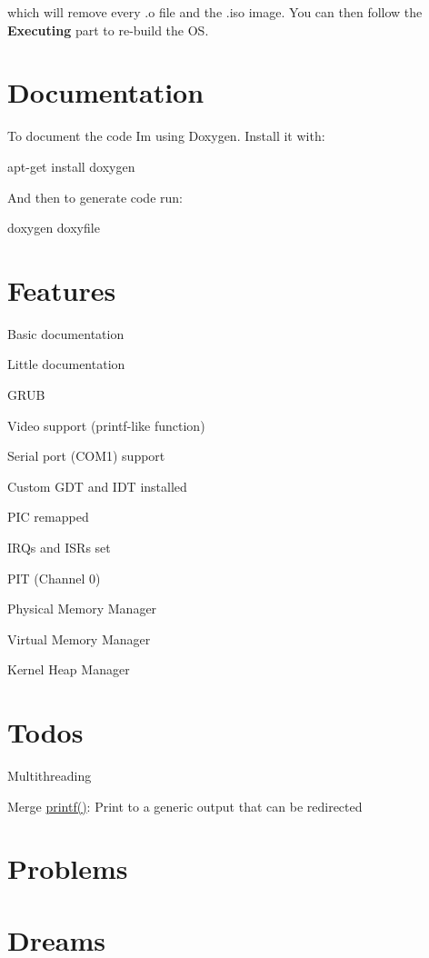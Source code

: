 which will remove every .o file and the .iso image. You can then follow the {\bfseries Executing} part to re-\/build the OS.\hypertarget{index_Documentation}{}\section{Documentation}\label{index_Documentation}
To document the code I\textquotesingle{}m using Doxygen. Install it with\+: 
\begin{DoxyCode}
apt-\textcolor{keyword}{get} install doxygen 
\end{DoxyCode}
 And then to generate code run\+: 
\begin{DoxyCode}
doxygen doxyfile
\end{DoxyCode}
\hypertarget{index_Features}{}\section{Features}\label{index_Features}

\begin{DoxyItemize}
\item Basic documentation
\item Little documentation
\item G\+R\+UB
\item Video support (printf-\/like function)
\item Serial port (C\+O\+M1) support
\item Custom G\+DT and I\+DT installed
\item P\+IC remapped
\item I\+R\+Qs and I\+S\+Rs set
\item P\+IT (Channel 0)
\item Physical Memory Manager
\item Virtual Memory Manager
\item Kernel Heap Manager
\end{DoxyItemize}\hypertarget{index_Todos}{}\section{Todos}\label{index_Todos}

\begin{DoxyItemize}
\item Multithreading
\item Merge \hyperlink{printf_8h_a98631211a4a8aee62f572375d5b637be}{printf()}\+: Print to a generic output that can be redirected
\end{DoxyItemize}\hypertarget{index_Problems}{}\section{Problems}\label{index_Problems}
\hypertarget{index_Dreams}{}\section{Dreams}\label{index_Dreams}


